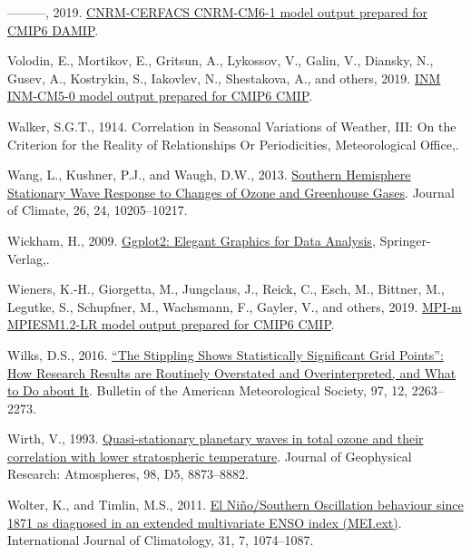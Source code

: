 \documentclass[12pt,oneside]{reedthesis}
\newlength{\cslhangindent}
\newenvironment{CSLReferences}[2] %
 {%
  \setlength{\parindent}{0pt}
  \ifodd #1 \everypar{\setlength{\hangindent}{\cslhangindent}}\ignorespaces\fi
  \ifnum #2 > 0
  \setlength{\parskip}{#2\baselineskip}
  \fi
 }%
 {}
\begin{document}
\begin{CSLReferences}{1}{0}
\leavevmode{}%
---------, 2019. \href{https://doi.org/10.22033/ESGF/CMIP6.1376}{CNRM-CERFACS CNRM-CM6-1 model output prepared for CMIP6 DAMIP}.

\leavevmode{}%
Volodin, E., Mortikov, E., Gritsun, A., Lykossov, V., Galin, V., Diansky, N., Gusev, A., Kostrykin, S., Iakovlev, N., Shestakova, A., and others, 2019. \href{https://doi.org/10.22033/ESGF/CMIP6.1423}{INM INM-CM5-0 model output prepared for CMIP6 CMIP}.

\leavevmode{}%
Walker, S.G.T., 1914. Correlation in {Seasonal Variations} of {Weather}, {III}: {On} the {Criterion} for the {Reality} of {Relationships Or Periodicities}, {Meteorological Office},.

\leavevmode{}%
Wang, L., Kushner, P.J., and Waugh, D.W., 2013. \href{https://doi.org/10.1175/JCLI-D-13-00160.1}{Southern {Hemisphere Stationary Wave Response} to {Changes} of {Ozone} and {Greenhouse Gases}}. Journal of Climate, 26, 24, 10205--10217.

\leavevmode{}%
Wickham, H., 2009. \href{https://doi.org/10.1007/978-0-387-98141-3}{Ggplot2: {Elegant Graphics} for {Data Analysis}}, {Springer-Verlag},.

\leavevmode{}%
Wieners, K.-H., Giorgetta, M., Jungclaus, J., Reick, C., Esch, M., Bittner, M., Legutke, S., Schupfner, M., Wachsmann, F., Gayler, V., and others, 2019. \href{https://doi.org/10.22033/ESGF/CMIP6.742}{MPI-m MPIESM1.2-LR model output prepared for CMIP6 CMIP}.

\leavevmode{}%
Wilks, D.S., 2016. \href{https://doi.org/10.1175/BAMS-D-15-00267.1}{{``{The Stippling Shows Statistically Significant Grid Points}''}: {How Research Results} are {Routinely Overstated} and {Overinterpreted}, and {What} to {Do} about {It}}. Bulletin of the American Meteorological Society, 97, 12, 2263--2273.

\leavevmode{}%
Wirth, V., 1993. \href{https://doi.org/10.1029/92JD02820}{Quasi-stationary planetary waves in total ozone and their correlation with lower stratospheric temperature}. Journal of Geophysical Research: Atmospheres, 98, D5, 8873--8882.

\leavevmode{}%
Wolter, K., and Timlin, M.S., 2011. \href{https://doi.org/10.1002/joc.2336}{El {Niño}/{Southern Oscillation} behaviour since 1871 as diagnosed in an extended multivariate {ENSO} index ({MEI}.ext)}. International Journal of Climatology, 31, 7, 1074--1087.


\end{CSLReferences}
\end{document}
